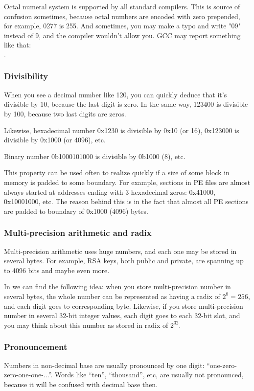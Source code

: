 Octal numeral system is supported by all standard \CCpp compilers.
This is source of confusion sometimes, because octal numbers are encoded with zero prepended, for example, 0277 is 255.
And sometimes, you may make a typo and write "09" instead of 9, and the compiler wouldn't allow you.
GCC may report something like that:\\
.

\subsubsection{Divisibility}

When you see a decimal number like 120, you can quickly deduce that it's divisible by 10, because the last digit is zero.
In the same way, 123400 is divisible by 100, because two last digits are zeros.

Likewise, hexadecimal number 0x1230 is divisible by 0x10 (or 16), 0x123000 is divisible by 0x1000 (or 4096), etc.

Binary number 0b1000101000 is divisible by 0b1000 (8), etc.

This property can be used often to realize quickly if a size of some block in memory is padded to some boundary.
For example, sections in \ac{PE} files are almost always started at addresses ending with 3 hexadecimal zeros: 0x41000, 0x10001000, etc.
The reason behind this is in the fact that almost all \ac{PE} sections are padded to boundary of 0x1000 (4096) bytes.

\subsubsection{Multi-precision arithmetic and radix}

Multi-precision arithmetic uses huge numbers, and each one may be stored in several bytes.
For example, RSA keys, both public and private, are spanning up to 4096 bits and maybe even more.

In  we can find the following idea: when you store multi-precision number in several bytes,
the whole number can be represented as having a radix of $2^8=256$, and each digit goes to corresponding byte.
Likewise, if you store multi-precision number in several 32-bit integer values, each digit goes to each 32-bit slot,
and you may think about this number as stored in radix of $2^{32}$.

\subsubsection{Pronouncement}

Numbers in non-decimal base are usually pronounced by one digit: ``one-zero-zero-one-one-...''.
Words like ``ten'', ``thousand'', etc, are usually not pronounced, because it will be confused with decimal base then.

